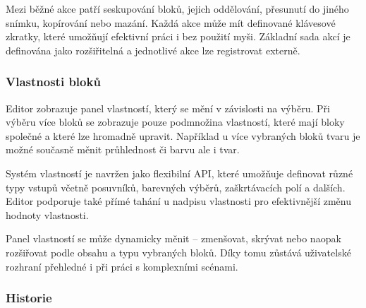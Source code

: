 Mezi běžné akce patří seskupování bloků, jejich oddělování, přesunutí do jiného snímku, kopírování nebo mazání. 
Každá akce může mít definované klávesové zkratky, které umožňují efektivní práci i bez použití myši. 
Základní sada akcí je definována jako rozšiřitelná a jednotlivé akce lze registrovat externě.

\subsubsection{Vlastnosti bloků}

Editor zobrazuje panel vlastností, který se mění v závislosti na výběru. 
Při výběru více bloků se zobrazuje pouze podmnožina vlastností, které mají bloky společné a které lze hromadně upravit. 
Například u více vybraných bloků tvaru je možné současně měnit průhlednost či barvu ale i tvar.

Systém vlastností je navržen jako flexibilní API, které umožňuje definovat různé typy vstupů včetně posuvníků, barevných výběrů, zaškrtávacích polí a dalších. 
Editor podporuje také přímé tahání u nadpisu vlastnosti pro efektivnější změnu hodnoty vlastnosti.

Panel vlastností se může dynamicky měnit -- zmenšovat, skrývat nebo naopak rozšiřovat podle obsahu a typu vybraných bloků. 
Díky tomu zůstává uživatelské rozhraní přehledné i při práci s komplexními scénami.








\subsubsection{Historie}

